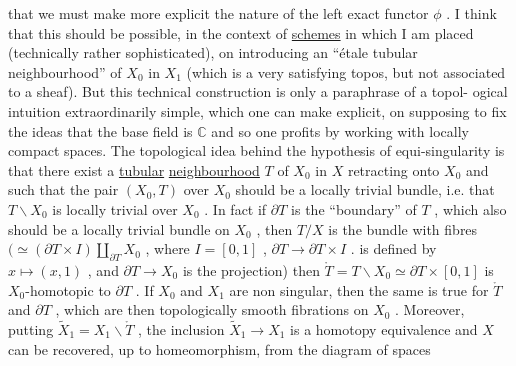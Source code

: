 
that we must make more explicit the nature of the left exact
functor $\phi$ . I think that this should be possible, in the context
of \uline{schemes} in which I am placed (technically rather sophisticated),
on introducing an ``étale tubular neighbourhood'' of $X_0$ in $X_1$
(which is a very satisfying topos, but not associated to a sheaf).
But this technical construction is only a paraphrase of a topol-%
ogical intuition extraordinarily simple, which one can make
explicit, on supposing to fix the ideas that the base field is
$\mathbb{C}$ and so one profits by working with locally compact spaces.
The topological idea behind the hypothesis of equi-singularity is
that there exist a \uline{tubular} \uline{neighbourhood} $T$ of $X_0$ in $X$
retracting onto $X_0$ and such that the pair $(X_0, T)$ over $X_0$
should be a locally trivial bundle, i.e. that $T\backslash X_0$ is locally
trivial over $X_0$ . In fact if $\partial T$ is the ``boundary'' of $T$ ,
which also should be a locally trivial bundle on $X_0$ , then $T/X$
is the bundle with fibres
$(\simeq (\partial T \times I) \amalg_{\partial T} X_0$ , where $I = [0, 1]$ , $\partial T \to \partial T \times I$ . is defined
by $x \longmapsto (x, 1)$ , and $\partial T \to X_0$ is the projection) then
$\mathring{T} = T\backslash X_0 \simeq \partial T \times [0, 1]$ is $X_0$-homotopic to $\partial T$ . If $X_0$ and
$X_1$ are non singular, then the same is true for $\mathring{T}$ and $\partial T$ ,
which are then topologically smooth fibrations on $X_0$ . Moreover,
putting $\tilde{X}_1 = X_1\backslash\mathring{T}$ , the inclusion $\tilde{X}_1 \to X_1$ is a homotopy equivalence
and $X$ can be recovered, up to homeomorphism, from the diagram
of spaces

